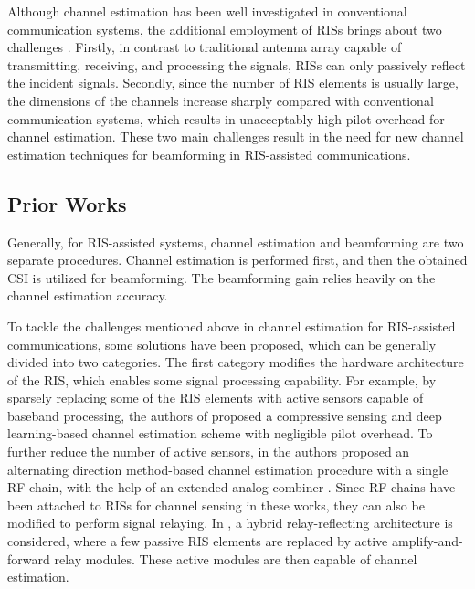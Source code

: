 \documentclass[journal,twocolumn]{IEEEtran}
\theoremstyle{nonumberplain}
\begin{document}
Although channel estimation has been well investigated in conventional communication systems, the additional employment of RISs brings about two challenges \cite{weili2021channel}.
Firstly, in contrast to traditional antenna array capable of transmitting, receiving, and processing the signals, RISs can only passively reflect the incident signals.
Secondly, since the number of RIS elements is usually large, the dimensions of the channels increase sharply compared with conventional communication systems, which results in unacceptably high pilot overhead for channel estimation.
These two main challenges result in the need for new channel estimation techniques for beamforming in RIS-assisted communications.

\subsection{Prior Works}
\label{Prior Works}
Generally, for RIS-assisted systems, channel estimation and beamforming are two separate procedures.
Channel estimation is performed first, and then the obtained \ac{CSI} is utilized for beamforming.
The beamforming gain relies heavily on the channel estimation accuracy.

To tackle the challenges mentioned above in channel estimation for RIS-assisted communications, some solutions have been proposed, which can be generally divided into two categories.
The first category modifies the hardware architecture of the RIS, which enables some signal processing capability.
For example, by sparsely replacing some of the RIS elements with active sensors capable of baseband processing, the authors of \cite{taha2021enabling} proposed a compressive sensing and deep learning-based channel estimation scheme with negligible pilot overhead. 
To further reduce the number of active sensors, in \cite{alexandropoulos2020hardware} the authors proposed an alternating direction method-based channel estimation procedure with a single \ac{RF} chain, with the help of an extended analog combiner \cite{vlachos2019wideband}. Since RF chains have been attached to RISs for channel sensing in these works, they can also be modified to perform signal relaying. In \cite{nguyen2021hybrid}, a hybrid relay-reflecting architecture is considered, where a few passive RIS elements are replaced by active amplify-and-forward relay modules. These active modules are then capable of channel estimation. 
\end{document}

